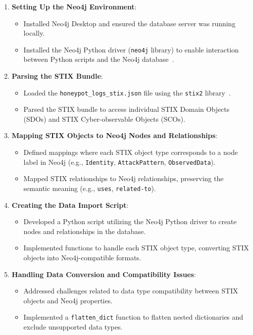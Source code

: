 \documentclass[conference]{IEEEtran}
\begin{document}
\begin{enumerate}
    \item \textbf{Setting Up the Neo4j Environment}:
    \begin{itemize}
        \item Installed Neo4j Desktop and ensured the database server was running locally.
        \item Installed the Neo4j Python driver (\texttt{neo4j} library) to enable interaction between Python scripts and the Neo4j database~\cite{neo4jpython}.
    \end{itemize}
    
    \item \textbf{Parsing the STIX Bundle}:
    \begin{itemize}
        \item Loaded the \texttt{honeypot\_logs\_stix.json} file using the \texttt{stix2} library~\cite{stix2python}.
        \item Parsed the STIX bundle to access individual STIX Domain Objects (SDOs) and STIX Cyber-observable Objects (SCOs).
    \end{itemize}
    
    \item \textbf{Mapping STIX Objects to Neo4j Nodes and Relationships}:
    \begin{itemize}
        \item Defined mappings where each STIX object type corresponds to a node label in Neo4j (e.g., \texttt{Identity}, \texttt{AttackPattern}, \texttt{ObservedData}).
        \item Mapped STIX relationships to Neo4j relationships, preserving the semantic meaning (e.g., \texttt{uses}, \texttt{related-to}).
    \end{itemize}
    
    \item \textbf{Creating the Data Import Script}:
    \begin{itemize}
        \item Developed a Python script utilizing the Neo4j Python driver to create nodes and relationships in the database.
        \item Implemented functions to handle each STIX object type, converting STIX objects into Neo4j-compatible formats.
    \end{itemize}
    
    \item \textbf{Handling Data Conversion and Compatibility Issues}:
    \begin{itemize}
        \item Addressed challenges related to data type compatibility between STIX objects and Neo4j properties.
        \item Implemented a \texttt{flatten\_dict} function to flatten nested dictionaries and exclude unsupported data types.
    \end{itemize}
    

\end{enumerate}
\end{document}
